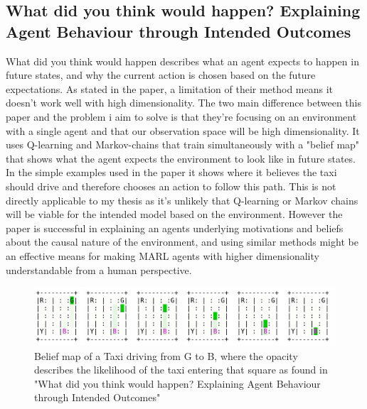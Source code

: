 \documentclass[UKenglish]{uiomasterthesis}
\begin{document}
\subsection{ What did you think would happen? Explaining Agent Behaviour through Intended Outcomes}
What did you think would happen describes what an agent expects to happen in future states, and why the current action is chosen based on the future expectations. As stated in the paper, a limitation of their method means it doesn't work well with high dimensionality. The two main difference between this paper and the problem i aim to solve is that they're focusing on an environment with a single agent and that our observation space will be high dimensionality. It uses Q-learning and Markov-chains that train simultaneously with a "belief map" that shows what the agent expects the environment to look like in future states. In the simple examples used in the paper it shows where it believes the taxi should drive and therefore chooses an action to follow this path. This is not directly applicable to my thesis as it's unlikely that Q-learning or Markov chains will be viable for the intended model based on the environment. However the paper is successful in explaining an agents underlying motivations and beliefs about the causal nature of the environment, and using similar methods might be an effective means for making MARL agents with higher dimensionality understandable from a human perspective.

\begin{figure}[!ht]
	\includegraphics[width=\columnwidth]{images/merged_14_dqntaxi.png}
	\caption{Belief map of a Taxi driving from G to B, where the opacity describes the likelihood of the taxi entering that square as found in "What did you think would happen? Explaining Agent Behaviour through Intended Outcomes" \cite{yau2020did}}
	\label{fig:environment}
\end{figure}
\end{document}
